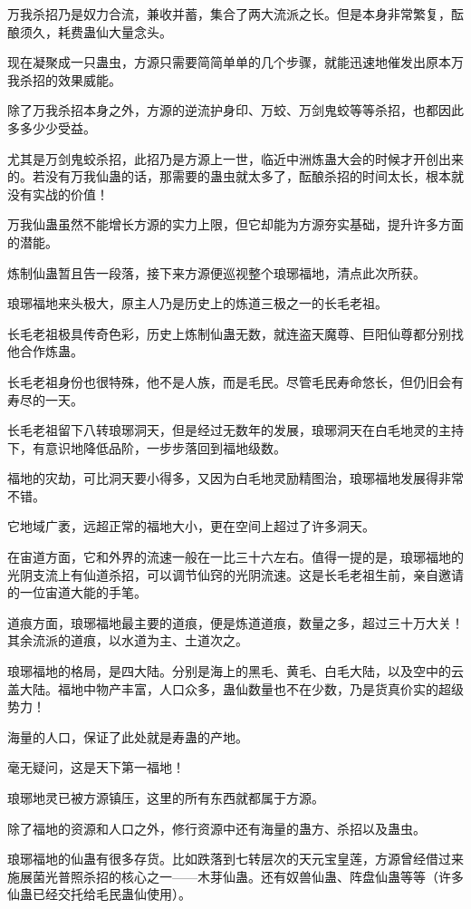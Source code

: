 \begin{this_body}
万我杀招乃是奴力合流，兼收并蓄，集合了两大流派之长。但是本身非常繁复，酝酿须久，耗费蛊仙大量念头。

现在凝聚成一只蛊虫，方源只需要简简单单的几个步骤，就能迅速地催发出原本万我杀招的效果威能。

除了万我杀招本身之外，方源的逆流护身印、万蛟、万剑鬼蛟等等杀招，也都因此多多少少受益。

尤其是万剑鬼蛟杀招，此招乃是方源上一世，临近中洲炼蛊大会的时候才开创出来的。若没有万我仙蛊的话，那需要的蛊虫就太多了，酝酿杀招的时间太长，根本就没有实战的价值！

万我仙蛊虽然不能增长方源的实力上限，但它却能为方源夯实基础，提升许多方面的潜能。

炼制仙蛊暂且告一段落，接下来方源便巡视整个琅琊福地，清点此次所获。

琅琊福地来头极大，原主人乃是历史上的炼道三极之一的长毛老祖。

长毛老祖极具传奇色彩，历史上炼制仙蛊无数，就连盗天魔尊、巨阳仙尊都分别找他合作炼蛊。

长毛老祖身份也很特殊，他不是人族，而是毛民。尽管毛民寿命悠长，但仍旧会有寿尽的一天。

长毛老祖留下八转琅琊洞天，但是经过无数年的发展，琅琊洞天在白毛地灵的主持下，有意识地降低品阶，一步步落回到福地级数。

福地的灾劫，可比洞天要小得多，又因为白毛地灵励精图治，琅琊福地发展得非常不错。

它地域广袤，远超正常的福地大小，更在空间上超过了许多洞天。

在宙道方面，它和外界的流速一般在一比三十六左右。值得一提的是，琅琊福地的光阴支流上有仙道杀招，可以调节仙窍的光阴流速。这是长毛老祖生前，亲自邀请的一位宙道大能的手笔。

道痕方面，琅琊福地最主要的道痕，便是炼道道痕，数量之多，超过三十万大关！其余流派的道痕，以水道为主、土道次之。

琅琊福地的格局，是四大陆。分别是海上的黑毛、黄毛、白毛大陆，以及空中的云盖大陆。福地中物产丰富，人口众多，蛊仙数量也不在少数，乃是货真价实的超级势力！

海量的人口，保证了此处就是寿蛊的产地。

毫无疑问，这是天下第一福地！

琅琊地灵已被方源镇压，这里的所有东西就都属于方源。

除了福地的资源和人口之外，修行资源中还有海量的蛊方、杀招以及蛊虫。

琅琊福地的仙蛊有很多存货。比如跌落到七转层次的天元宝皇莲，方源曾经借过来施展菌光普照杀招的核心之一——木芽仙蛊。还有奴兽仙蛊、阵盘仙蛊等等（许多仙蛊已经交托给毛民蛊仙使用）。


\end{this_body}
